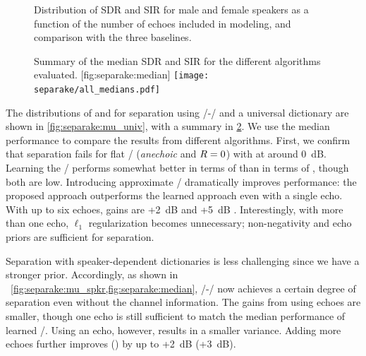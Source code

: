 \begin{figure}[t]
    \begin{fullwidth}
    \centering
    \hfill
    \hfill
    \caption{Distribution of SDR and SIR for male and female speakers as a function of the number of echoes included in modeling, and comparison with the three baselines.}
    \label{fig:separake:results}
    \end{fullwidth}
\end{figure}


\begin{figure}[th]
    \begin{sidecaption}[]{
            Summary of the median SDR and SIR for the different algorithms evaluated.
            \label{fig:separake:median}
        }[fig:separake:median]
        \centering
        \small
        \texttt{[image: separake/all\_medians.pdf]}
    \end{sidecaption}
\end{figure}

\mynewline
The distributions of \SDR and \SIR for separation using \MU/-\NMF/ and a universal dictionary are shown in \cref{fig:separake:mu_univ}, with a summary in \cref{fig:separake:median}.
We use the median performance to compare the results from different algorithms.
First, we confirm that separation fails for flat \RTFs/ (\textit{anechoic} and $R=0$) with \SIR at around 0~dB.
Learning the \RTFs/ performs somewhat better in terms of \SIR than in terms of \SDR, though both are low.
Introducing approximate \RTFs/ dramatically improves performance: the proposed approach outperforms the learned approach even with a single echo.
With up to six echoes, gains are +2~dB \SDR and +5~dB \SIR.
Interestingly, with more than one echo, $\ell_1$ regularization becomes unnecessary; non-negativity and echo priors are sufficient for separation.

\mynewline
Separation with speaker-dependent dictionaries is less challenging since we have a stronger prior.
Accordingly, as shown in ~\cref{fig:separake:mu_spkr,fig:separake:median}, \MU/-\NMF/ now achieves a certain degree of separation even without the channel information.
The gains from using echoes are smaller, though one echo is still sufficient to match the median performance of learned \RTFs/.
Using an echo, however, results in a smaller variance.
Adding more echoes further improves \SDR{} (\SIR) by up to +2~dB (+3~dB).

